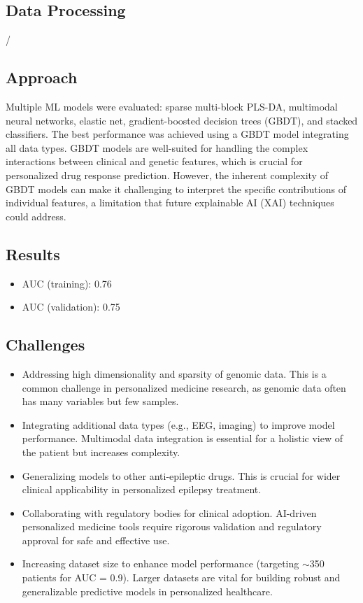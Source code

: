 \subsection*{Data Processing}
/
\subsection*{Approach}
Multiple ML models were evaluated: sparse multi-block PLS-DA, multimodal neural networks, elastic net, gradient-boosted decision trees (GBDT), and stacked classifiers. The best performance was achieved using a GBDT model integrating all data types. GBDT models are well-suited for handling the complex interactions between clinical and genetic features, which is crucial for personalized drug response prediction. However, the inherent complexity of GBDT models can make it challenging to interpret the specific contributions of individual features, a limitation that future explainable AI (XAI) techniques could address.

\subsection*{Results}
\begin{itemize}
    \item AUC (training): 0.76
    \item AUC (validation): 0.75
\end{itemize}

\subsection*{Challenges}
\begin{itemize}
    \item Addressing high dimensionality and sparsity of genomic data. This is a common challenge in personalized medicine research, as genomic data often has many variables but few samples.
    \item Integrating additional data types (e.g., EEG, imaging) to improve model performance. Multimodal data integration is essential for a holistic view of the patient but increases complexity.
    \item Generalizing models to other anti-epileptic drugs. This is crucial for wider clinical applicability in personalized epilepsy treatment.
    \item Collaborating with regulatory bodies for clinical adoption. AI-driven personalized medicine tools require rigorous validation and regulatory approval for safe and effective use.
    \item Increasing dataset size to enhance model performance (targeting $\sim$350 patients for AUC = 0.9). Larger datasets are vital for building robust and generalizable predictive models in personalized healthcare.
\end{itemize}

